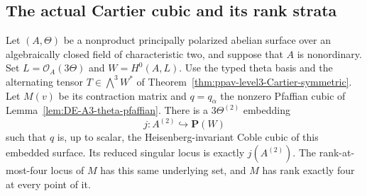 \subsection{The actual Cartier cubic and its rank strata}

\begin{lemma}
\label{lem:root-nonordinary-Coble-identification-candidate}
Let $(A,\Theta)$ be a nonproduct principally polarized abelian surface
over an algebraically closed field of characteristic two, and suppose
that $A$ is nonordinary. Set $L=\mathcal O_A(3\Theta)$ and
$W=H^0(A,L)$. Use the typed theta basis and the alternating tensor
$T\in\bigwedge^3W^*$ of
Theorem~\ref{thm:ppav-level3-Cartier-symmetric}.
Let $M(v)$ be its contraction matrix and $q=q_\alpha$ the nonzero
Pfaffian cubic of Lemma~\ref{lem:DE-A3-theta-pfaffian}.
There is a $3\Theta^{(2)}$ embedding
\[
                 j:A^{(2)}\hookrightarrow\mathbf P(W)
\]
such that $q$ is, up to scalar, the Heisenberg-invariant Coble cubic
of this embedded surface. Its reduced singular locus is exactly
$j(A^{(2)})$. The rank-at-most-four locus of $M$ has this same
underlying set, and $M$ has rank exactly four at every point of it.
\end{lemma}
